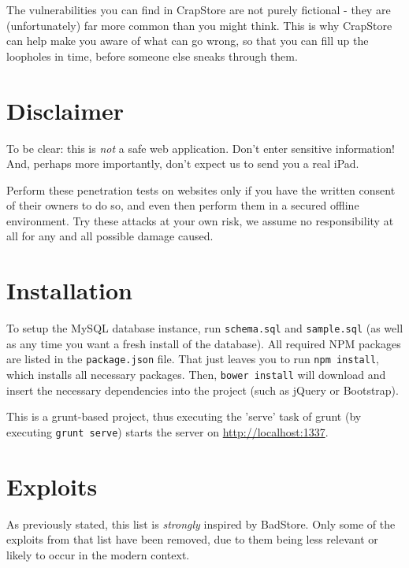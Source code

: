 \documentclass[12pt,a4paper]{article}
\newcommand{\inlinecode}{\texttt}
\begin{document}
The vulnerabilities you can find in CrapStore are not purely fictional - they are (unfortunately) far more common than you might think. This is why CrapStore can help make you aware of what can go wrong, so that you can fill up the loopholes in time, before someone else sneaks through them.

\section{Disclaimer}
To be clear: this is \emph{not} a safe web application. Don't enter sensitive information! And, perhaps more importantly, don't expect us to send you a real iPad.

Perform these penetration tests on websites only if you have the written consent of their owners to do so, and even then perform them in a secured offline environment. Try these attacks at your own risk, we assume no responsibility at all for any and all possible damage caused.

\section{Installation}
To setup the MySQL database instance, run \inlinecode{schema.sql} and \inlinecode{sample.sql} (as well as any time you want a fresh install of the database). All required NPM packages are listed in the \inlinecode{package.json} file. That just leaves you to run \inlinecode{npm install}, which installs all necessary packages. Then, \inlinecode{bower install} will download and insert the necessary dependencies into the project (such as jQuery or Bootstrap).

This is a grunt-based project, thus executing the 'serve' task of grunt (by executing \inlinecode{grunt serve}) starts the server on \url{http://localhost:1337}.


\section{Exploits}
As previously stated, this list is \emph{strongly} inspired by BadStore. Only some of the exploits from that list have been removed, due to them being less relevant or likely to occur in the modern context.

\end{document}
